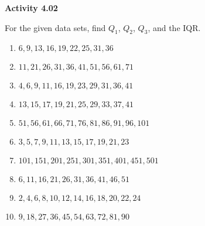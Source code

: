\vspace{0.3ex}
\noindent\textbf{Activity 4.02}

\vspace{0.2ex}

For the given data sets, find \(Q_1\), \(Q_2\), \(Q_3\), and the IQR. 

\begin{enumerate}
    \item \(6, 9, 13, 16, 19, 22, 25, 31, 36\)  
    \item \(11, 21, 26, 31, 36, 41, 51, 56, 61, 71\)  
    \item \(4, 6, 9, 11, 16, 19, 23, 29, 31, 36, 41\)  
    \item \(13, 15, 17, 19, 21, 25, 29, 33, 37, 41\)  
    \item \(51, 56, 61, 66, 71, 76, 81, 86, 91, 96, 101\)  
    \item \(3, 5, 7, 9, 11, 13, 15, 17, 19, 21, 23\)  
    \item \(101, 151, 201, 251, 301, 351, 401, 451, 501\)  
    \item \(6, 11, 16, 21, 26, 31, 36, 41, 46, 51\)  
    \item \(2, 4, 6, 8, 10, 12, 14, 16, 18, 20, 22, 24\)  
    \item \(9, 18, 27, 36, 45, 54, 63, 72, 81, 90\)  
\end{enumerate}
